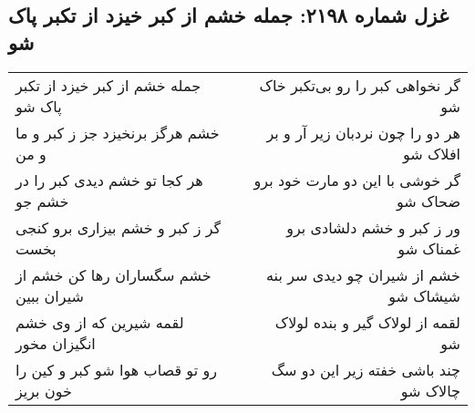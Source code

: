 \begin{center}
\section*{غزل شماره ۲۱۹۸: جمله خشم از کبر خیزد از تکبر پاک شو}
\label{sec:2198}
\begin{longtable}{l p{0.5cm} r}
جمله خشم از کبر خیزد از تکبر پاک شو
&&
گر نخواهی کبر را رو بی‌تکبر خاک شو
\\
خشم هرگز برنخیزد جز ز کبر و ما و من
&&
هر دو را چون نردبان زیر آر و بر افلاک شو
\\
هر کجا تو خشم دیدی کبر را در خشم جو
&&
گر خوشی با این دو مارت خود برو ضحاک شو
\\
گر ز کبر و خشم بیزاری برو کنجی بخست
&&
ور ز کبر و خشم دلشادی برو غمناک شو
\\
خشم سگساران رها کن خشم از شیران ببین
&&
خشم از شیران چو دیدی سر بنه شیشاک شو
\\
لقمه شیرین که از وی خشم انگیزان مخور
&&
لقمه از لولاک گیر و بنده لولاک شو
\\
رو تو قصاب هوا شو کبر و کین را خون بریز
&&
چند باشی خفته زیر این دو سگ چالاک شو
\\
\end{longtable}
\end{center}
